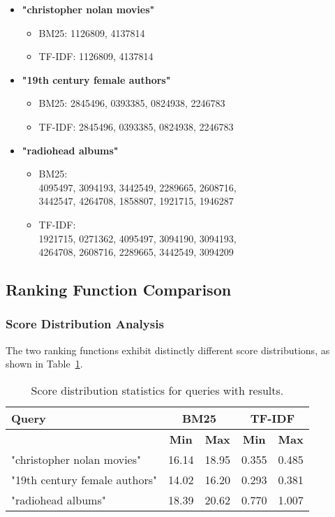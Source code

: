 \documentclass[sigconf]{acmart}
\begin{document}
\begin{itemize}
    \item \textbf{"christopher nolan movies"}
    \begin{itemize}
        \item BM25: 1126809, 4137814
        \item TF-IDF: 1126809, 4137814
    \end{itemize}
    
    \item \textbf{"19th century female authors"}
    \begin{itemize}
        \item BM25: 2845496, 0393385, 0824938, 2246783
        \item TF-IDF: 2845496, 0393385, 0824938, 2246783
    \end{itemize}
    
    \item \textbf{"radiohead albums"}
    \begin{itemize}
        \item BM25: \\
        4095497, 3094193, 3442549, 2289665, 2608716, \\ 
        3442547, 4264708, 1858807, 1921715, 1946287
        \item TF-IDF: \\
        1921715, 0271362, 4095497, 3094190, 3094193, \\ 
        4264708, 2608716, 2289665, 3442549, 3094209
    \end{itemize}
\end{itemize}
\subsection{Ranking Function Comparison}

\subsubsection{Score Distribution Analysis}
The two ranking functions exhibit distinctly different score distributions, as shown in Table~\ref{tab:score_stats}.

\begin{table}[H]
\centering
\begin{tabular}{|l|c|c|c|c|}
\hline
\textbf{Query} & \multicolumn{2}{c|}{\textbf{BM25}} & \multicolumn{2}{c|}{\textbf{TF-IDF}} \\ \hline
 & \textbf{Min} & \textbf{Max} & \textbf{Min} & \textbf{Max} \\ \hline
"christopher nolan movies" & 16.14 & 18.95 & 0.355 & 0.485 \\ \hline
"19th century female authors" & 14.02 & 16.20 & 0.293 & 0.381 \\ \hline
"radiohead albums" & 18.39 & 20.62 & 0.770 & 1.007 \\ \hline
\end{tabular}
\caption{Score distribution statistics for queries with results.}
\label{tab:score_stats}
\end{table}
\end{document}

